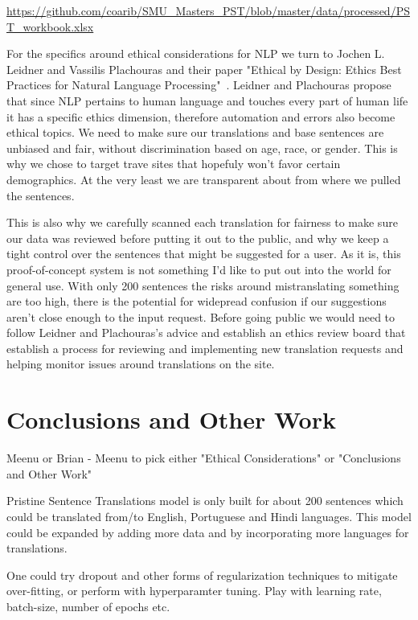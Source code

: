 \documentclass[runningheads]{llncs}
\begin{document}
\url{https://github.com/coarib/SMU_Masters_PST/blob/master/data/processed/PST_workbook.xlsx}


For the specifics around ethical considerations for NLP we turn to Jochen L. Leidner and Vassilis Plachouras and their paper "Ethical by Design: Ethics Best Practices for Natural Language Processing"~\cite{ref_url15}.  Leidner and Plachouras propose that since NLP pertains to human language and touches every part of human life it has a specific ethics dimension, therefore automation and errors also become ethical topics. We need to make sure our translations and base sentences are unbiased and fair, without discrimination based on age, race, or gender. This is why we chose to target trave sites that hopefuly won't favor certain demographics. At the very least we are transparent about from where we pulled the sentences.


This is also why we carefully scanned each translation for fairness to make sure our data was reviewed before putting it out to the public, and why we keep a tight control over the sentences that might be suggested for a user. As it is, this proof-of-concept system is not something I'd like to put out into the world for general use. With only 200 sentences the risks around mistranslating something are too high, there is the potential for widepread confusion if our suggestions aren't close enough to the input request. Before going public we would need to follow Leidner and Plachouras's advice and establish an ethics review board that establish a process for reviewing and implementing new translation requests and helping monitor issues around translations on the site.

	
	
	\section{Conclusions and Other Work}
	Meenu or Brian - Meenu to pick either "Ethical Considerations" or "Conclusions and Other Work"
	
	Pristine Sentence Translations model is only built for about 200 sentences which could be translated from/to English, Portuguese and Hindi languages. This model could be expanded by adding more data and by incorporating more languages for translations.
	
	One could try dropout and other forms of regularization techniques to mitigate over-fitting, or perform with hyperparamter tuning. Play with learning rate, batch-size, number of epochs etc.
	
\end{document}
